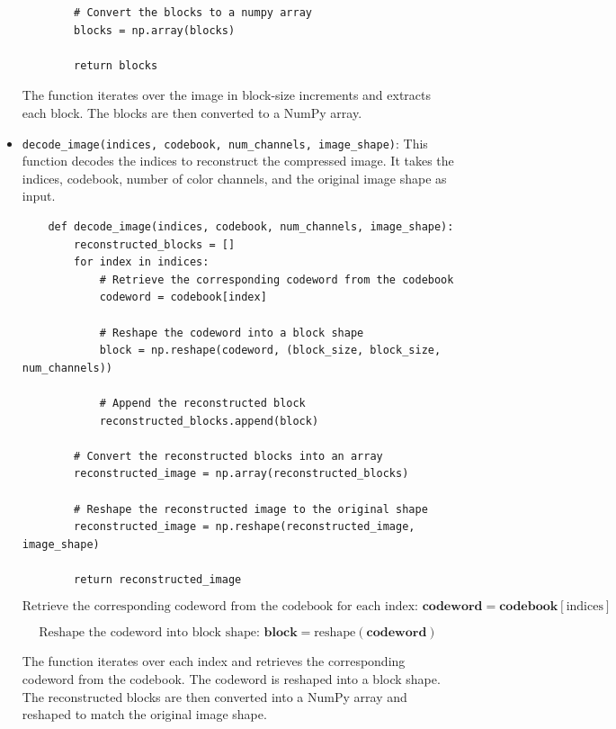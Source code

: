 \documentclass{article}
\begin{document}
\begin{itemize}
\begin{code}
\begin{verbatim}
        # Convert the blocks to a numpy array
        blocks = np.array(blocks)

        return blocks
    \end{verbatim}
    \end{code}

    The function iterates over the image in block-size increments and extracts each block. The blocks are then converted to a NumPy array.

    \item \texttt{decode\_image(indices, codebook, num\_channels, image\_shape)}: This function decodes the indices to reconstruct the compressed image. It takes the indices, codebook, number of color channels, and the original image shape as input.

    \begin{code}
    \begin{verbatim}
    def decode_image(indices, codebook, num_channels, image_shape):
        reconstructed_blocks = []
        for index in indices:
            # Retrieve the corresponding codeword from the codebook
            codeword = codebook[index]

            # Reshape the codeword into a block shape
            block = np.reshape(codeword, (block_size, block_size, num_channels))

            # Append the reconstructed block
            reconstructed_blocks.append(block)

        # Convert the reconstructed blocks into an array
        reconstructed_image = np.array(reconstructed_blocks)

        # Reshape the reconstructed image to the original shape
        reconstructed_image = np.reshape(reconstructed_image, image_shape)

        return reconstructed_image
    \end{verbatim}
    
    \end{code}

    \begin{equation*}
\text{Retrieve the corresponding codeword from the codebook for each index: } \mathbf{codeword} = \mathbf{codebook}[\text{indices}]
\end{equation*}

\begin{equation*}
\text{Reshape the codeword into block shape: } \mathbf{block} = \text{reshape}(\mathbf{codeword})
\end{equation*}

    The function iterates over each index and retrieves the corresponding codeword from the codebook. The codeword is reshaped into a block shape. The reconstructed blocks are then converted into a NumPy array and reshaped to match the original image shape.

\end{itemize}
\end{document}
